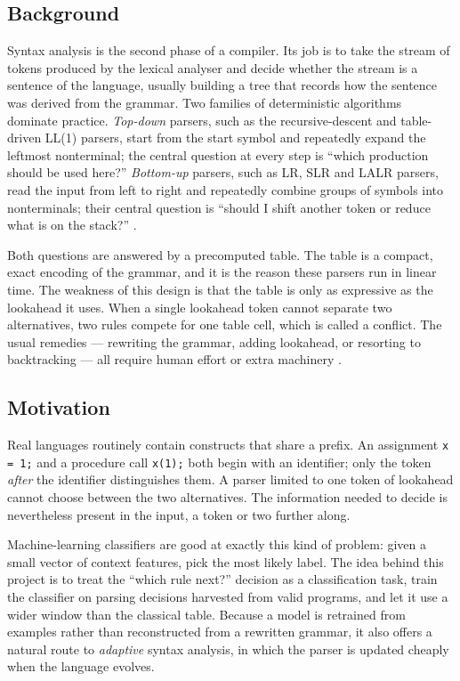 \documentclass[12pt,a4paper]{article}
\newcommand{\tok}[1]{\texttt{#1}}
\begin{document}
\subsection{Background}

Syntax analysis is the second phase of a compiler. Its job is to take the
stream of tokens produced by the lexical analyser and decide whether the
stream is a sentence of the language, usually building a tree that records how
the sentence was derived from the grammar. Two families of deterministic
algorithms dominate practice. \emph{Top-down} parsers, such as the recursive-descent
and table-driven LL(1) parsers, start from the start symbol and repeatedly
expand the leftmost nonterminal; the central question at every step is
``which production should be used here?'' \emph{Bottom-up} parsers, such as LR,
SLR and LALR parsers, read the input from left to right and repeatedly
combine groups of symbols into nonterminals; their central question is
``should I shift another token or reduce what is on the stack?''
\cite{aho2006,grune2008}.

Both questions are answered by a precomputed table. The table is a compact,
exact encoding of the grammar, and it is the reason these parsers run in
linear time. The weakness of this design is that the table is only as
expressive as the lookahead it uses. When a single lookahead token cannot
separate two alternatives, two rules compete for one table cell, which is
called a conflict. The usual remedies --- rewriting the grammar, adding
lookahead, or resorting to backtracking --- all require human effort or extra
machinery \cite{parr2011,parr2014}.

\subsection{Motivation}

Real languages routinely contain constructs that share a prefix. An assignment
\tok{x = 1;} and a procedure call \tok{x(1);} both begin with an identifier;
only the token \emph{after} the identifier distinguishes them. A parser limited
to one token of lookahead cannot choose between the two alternatives. The
information needed to decide is nevertheless present in the input, a token or
two further along.

Machine-learning classifiers are good at exactly this kind of problem: given a
small vector of context features, pick the most likely label. The idea behind
this project is to treat the ``which rule next?'' decision as a classification
task, train the classifier on parsing decisions harvested from valid programs,
and let it use a wider window than the classical table. Because a model is
retrained from examples rather than reconstructed from a rewritten grammar, it
also offers a natural route to \emph{adaptive} syntax analysis, in which the
parser is updated cheaply when the language evolves.
\end{document}
